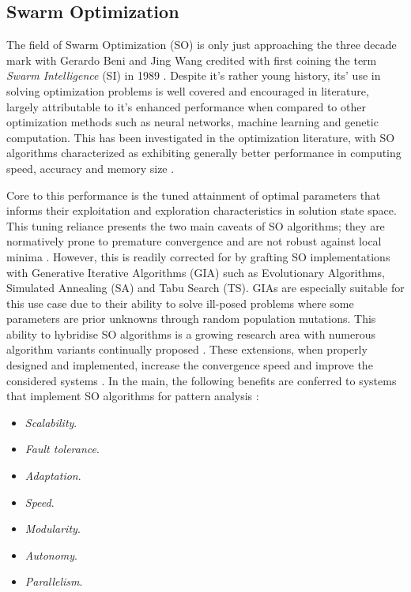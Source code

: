 \documentclass{report}
\begin{document}
\subsection{Swarm Optimization}
The field of Swarm Optimization (SO) is only just approaching the three decade mark with Gerardo Beni and Jing Wang credited with first coining the term \textit{Swarm Intelligence} (SI) in 1989 \cite{Garg2009}. Despite it's rather young history, its' use in solving optimization problems is well covered and encouraged in literature, largely attributable to it's enhanced performance when compared to other optimization methods such as neural networks, machine learning and genetic computation. This has been investigated in the optimization literature, with SO algorithms characterized as exhibiting generally better performance in computing speed, accuracy and memory size \cite{Tran2016}.

Core to this performance is the tuned attainment of optimal parameters that informs their exploitation and exploration characteristics in solution state space. This tuning reliance presents the two main caveats of SO algorithms; they are normatively prone to premature convergence and are not robust against local minima \cite{Cuevas2013}. However, this is readily corrected for by grafting SO implementations with Generative Iterative Algorithms (GIA) such as Evolutionary Algorithms, Simulated Annealing (SA) and Tabu Search (TS). GIAs are especially suitable for this use case due to their ability to solve ill-posed problems where some parameters are prior unknowns \cite{Youssef2001} through random population mutations. This ability to hybridise SO algorithms is a growing research area with numerous algorithm variants continually proposed \cite{Tran2016} \cite{Coello2006} \cite{Phung2017}. These extensions, when properly designed and implemented, increase the convergence speed and improve the considered systems \cite{Tran2016}. In the main, the following benefits are conferred to systems that implement SO algorithms for pattern analysis \cite{Cuevas2013}:
\begin{itemize}
	\item \textit{Scalability}.
	\item \textit{Fault tolerance}.
	\item \textit{Adaptation}.
	\item \textit{Speed}.
	\item \textit{Modularity}.
	\item \textit{Autonomy}.
	\item \textit{Parallelism}.
\end{itemize}
\end{document}
